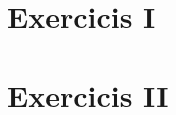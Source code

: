 \appendix
\section{Exercicis I}
\label{appendExe1}

\appendix
\section{Exercicis II}
\label{appendExe2}
